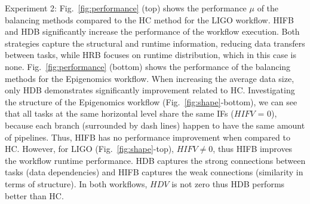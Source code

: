 \documentclass[final]{IEEEtran}
\begin{document}
Experiment 2: Fig.~\ref{fig:performance} (top) shows the performance $\mu$ of the balancing methods compared to the HC method for the LIGO workflow. HIFB and HDB significantly increase the performance of the workflow execution. Both strategies capture the structural and runtime information, reducing data transfers between tasks, while HRB focuses on runtime distribution, which in this case is none. Fig.~\ref{fig:performance} (bottom) shows the performance of the balancing methods for the Epigenomics workflow. When increasing the average data size, only HDB demonstrates significantly improvement related to HC. Investigating the structure of the Epigenomics workflow (Fig.~\ref{fig:shape}-bottom), we can see that all tasks at the same horizontal level share the same IFs ($HIFV$ = 0), because each branch (surrounded by dash lines) happen to have the same amount of pipelines. Thus, HIFB has no performance improvement when compared to HC. However, for LIGO (Fig.~\ref{fig:shape}-top), $HIFV \neq 0$, thus HIFB improves the workflow runtime performance.  
HDB captures the strong connections between tasks (data dependencies) and HIFB captures the weak connections (similarity in terms of structure). In both workflows, $HDV$ is not zero thus HDB performs better than HC. 

\end{document}
